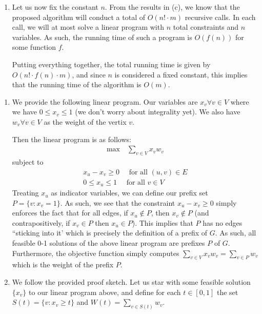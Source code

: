 \documentclass[12pt]{exam}
\newcommand{\Q}[1]{\question{\large{\textbf{#1}}}}
\begin{document}
\begin{questions}
\begin{solution}
\begin{enumerate}[label=(\alph*)]
      \item
        Let us now fix the constant $n$. From the results in (c), we know that the proposed algorithm will conduct a total of $O(n! \cdot m)$ recursive calls. In each call, we will at most solve a linear program with $n$ total constraints and $n$ variables. As such, the running time of such a program is $O(f(n))$ for some function $f$. 

        Putting everything together, the total running time is given by $O(n! \cdot f(n) \cdot m )$, and since $n$ is considered a fixed constant, this implies that the running time of the algorithm is $O(m)$.

  \end{enumerate}
\end{solution}


\newpage
\Q{Problem 11}
\begin{solution}
  \begin{enumerate}[label=(\alph*)]
    \item 
      We provide the following linear program. Our variables are $x_v \forall v \in V$ where we have $0 \leq x_v \leq 1$ (we don't worry about integrality yet). We also have $w_v \forall v \in V$ as the weight of the vertix $v$. 

      Then the linear program is as follows:
      \begin{align}
        \text{max} \quad \sum_{v \in V} x_v w_v 
      \end{align}
      subject to
      \begin{align}
        x_u - x_v \geq 0 \quad \text{ for all } (u,v) \in E \label{p11:constraint_1} \\
        0 \leq x_u \leq 1 \quad \text{ for all } v \in V
      \end{align}
  Treating $x_u$ as indicator variables, we can define our prefix set $P = \{ v : x_v = 1\}$. As such, we see that the constraint $x_u - x_v \geq 0$ simply enforces the fact that for all edges, if $x_u \notin P$, then $x_v \notin P$ (and contrapositively, if $x_v \in P$ then $x_u \in P$). This implies that $P$ has no edges ``sticking into it' which is precisely the definition of a prefix of $G$. As such, all feasible 0-1 solutions of the above linear program are prefixes $P$ of $G$. Furthermore, the objective function simply computes $\sum_{v \in V} x_vw_v = \sum_{v \in P} w_v$ which is the weight of the prefix $P$.


  \item
    We follow the provided proof sketch. Let us star with some feasible solution $\{x_v\}$ to our linear program above, and define for each $t \in [0,1]$ the set $S(t) = \{ v : x_v \geq t \}$ and $W(t) = \sum_{v \in S(t)} w_v$. 


\end{enumerate}
\end{solution}
\end{questions}
\end{document}
